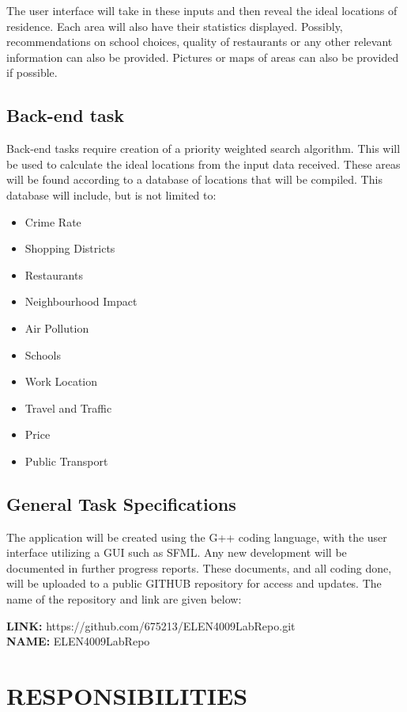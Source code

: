 	 The user interface will take in these inputs and then reveal the ideal locations of residence. Each area will also have their statistics displayed. Possibly, recommendations on school choices, quality of restaurants or any other relevant information can also be provided. Pictures or maps of areas can also be provided if possible.
	 
	
	\subsection{Back-end task}
	
	 Back-end tasks require creation of a priority weighted search algorithm. This will be used to calculate the ideal locations from the input data received. These areas will be found according to a database of locations that will be compiled. This database will include, but is not limited to:

	\begin{itemize}
		\item Crime Rate
		\item Shopping Districts
		\item Restaurants
		\item Neighbourhood Impact
		\item Air Pollution
		\item Schools
		\item Work Location 
		\item Travel and Traffic
		\item Price
		\item Public Transport
	\end{itemize}	 
	
	\subsection{General Task Specifications}
	
	The application will be created using the G++ coding language, with the user interface utilizing a GUI such as SFML. Any new development will be documented in further progress reports. These documents, and all coding done, will be uploaded to a public GITHUB repository for access and updates. The name of the repository and link are given below:
	
		\textbf{LINK:} https://github.com/675213/ELEN4009LabRepo.git
		\\
		\textbf{NAME:} ELEN4009LabRepo
	\section{RESPONSIBILITIES}
	
